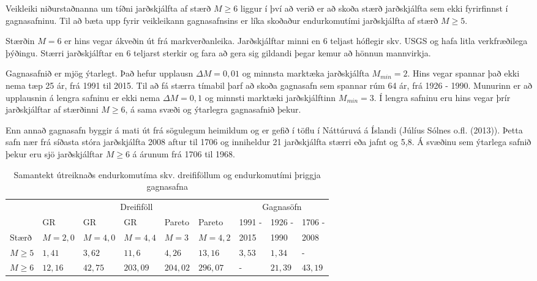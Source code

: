 \documentclass[10pt,a4paper,titlepage,twoside]{article}
\begin{document}
Veikleiki niðurstaðnanna um tíðni jarðskjálfta af stærð $M\geq6$ liggur í því að verið er að skoða stærð jarðskjálfta sem ekki fyrirfinnst í gagnasafninu. Til að bæta upp fyrir veikleikann gagnasafnsins er líka skoðaður endurkomutími jarðskjálfta af stærð $M\geq5$.

Stærðin $M=6$ er hins vegar ákveðin út frá markverðanleika. Jarðskjálftar minni en 6 teljast hóflegir skv. USGS og hafa litla verkfræðilega þýðingu. Stærri jarðskjálftar en 6 teljarst sterkir og fara að gera sig gildandi þegar kemur að hönnun mannvirkja.

Gagnasafnið er mjög ýtarlegt. Það hefur upplausn $\Delta M=0,01$ og minnsta marktæka jarðskjálfta $M_{min}=2$. Hins vegar spannar það ekki nema tæp 25 ár, frá 1991 til 2015. Til að fá stærra tímabil þarf að skoða gagnasafn sem spannar rúm 64 ár, frá 1926 - 1990. Munurinn er að upplausnin á lengra safninu er ekki nema $\Delta M=0,1$ og minnsti marktæki jarðskjálftinn $M_{min}=3$. Í lengra safninu eru hins vegar þrír jarðskjálftar af stærðinni $M\geq6$, á sama svæði og ýtarlegra gagnasafnið þekur.

Enn annað gagnasafn byggir á mati út frá sögulegum heimildum og er gefið í töflu í Náttúruvá á Íslandi (Júlíus Sólnes o.fl. (2013)). Þetta safn nær frá síðasta stóra jarðskjálfta 2008 aftur til 1706 og inniheldur 21 jarðskjálfta stærri eða jafnt og 5,8. Á svæðinu sem ýtarlega safnið þekur eru sjö jarðskjálftar $M\geq 6$ á árunum frá 1706 til 1968.

\begin{table}[h]
  \centering
  \begin{tabular}{|l|p{1.4cm}p{1.4cm}p{1.4cm}p{1.4cm}p{1.4cm}|p{1.2cm}p{1.2cm}p{1.2cm}|}
  \hline
        & \multicolumn{5}{|c|}{Dreififöll} & \multicolumn{3}{|c|}{Gagnasöfn} \\
        & GR & GR & GR & Pareto & Pareto & 1991 -& 1926 - & 1706 -\\
     Stærð & $M=2,0$ & $M=4,0$ & $M=4,4$ & $M=3$ & $M=4,2$ & 2015 & 1990 & 2008\\
  \hline
  $M\geq5$ & $1,41$ & $3,62$ & $11,6$ & $4,26$ & $13,16$ & $3,53$ & $1,34$ & - \\
  $M\geq6$ & $ 12,16$ & $42,75$ & $203,09$ & $204,02$ & $296,07$ & - & $21,39$ & $43,19$ \\
  \hline
  \end{tabular}
  \caption{Samantekt útreiknaðs endurkomutíma skv. dreififöllum og endurkomutími þriggja gagnasafna}
  \label{table:prob}
\end{table}
\end{document}

